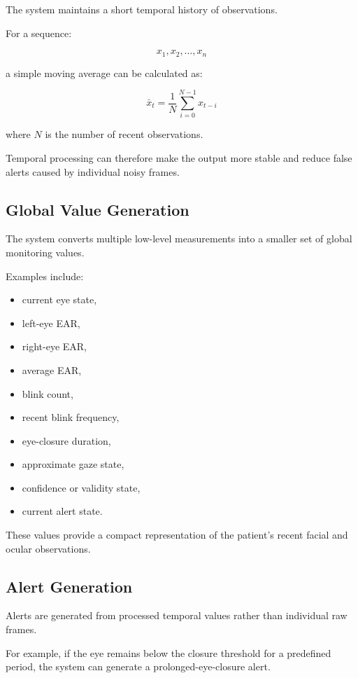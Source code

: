 \documentclass[12pt]{tietreport}
\begin{document}
The system maintains a short temporal history of observations.

For a sequence:

\[
x_1,x_2,\ldots,x_n
\]

a simple moving average can be calculated as:

\begin{equation}
\bar{x}_t =
\frac{1}{N}
\sum_{i=0}^{N-1}x_{t-i}
\end{equation}

where $N$ is the number of recent observations.

Temporal processing can therefore make the output more stable and
reduce false alerts caused by individual noisy frames.

\subsection{Global Value Generation}

The system converts multiple low-level measurements into a smaller
set of global monitoring values.

Examples include:

\begin{itemize}[leftmargin=*]
    \item current eye state,
    \item left-eye EAR,
    \item right-eye EAR,
    \item average EAR,
    \item blink count,
    \item recent blink frequency,
    \item eye-closure duration,
    \item approximate gaze state,
    \item confidence or validity state,
    \item current alert state.
\end{itemize}

These values provide a compact representation of the patient's
recent facial and ocular observations.

\subsection{Alert Generation}

Alerts are generated from processed temporal values rather than
individual raw frames.

For example, if the eye remains below the closure threshold for a
predefined period, the system can generate a prolonged-eye-closure
alert.
\end{document}
